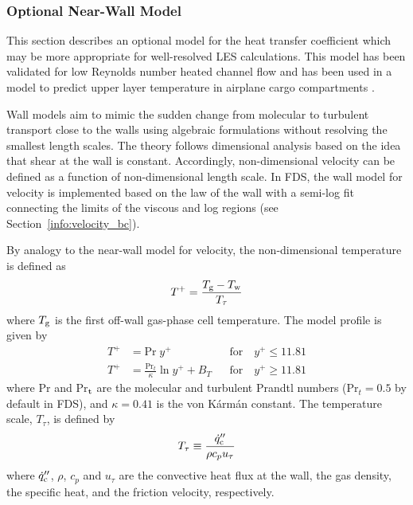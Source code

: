 \subsubsection{Optional Near-Wall Model}
\label{conflux_wall_model}

This section describes an optional model for the heat transfer coefficient which may be more appropriate for well-resolved LES calculations.  This model has been validated for low Reynolds number heated channel flow \cite{Park:2012} and has been used in a model to predict upper layer temperature in airplane cargo compartments \cite{Oztekin:FM2012}.

Wall models aim to mimic the sudden change from molecular to turbulent transport close to the walls using algebraic formulations without resolving the smallest length scales. The theory follows dimensional analysis based on the idea that shear at the wall is constant. Accordingly, non-dimensional velocity can be defined as a function of non-dimensional length scale. In FDS, the wall model for velocity is implemented based on the law of the wall with a semi-log fit connecting the limits of the viscous and log regions (see Section~\ref{info:velocity_bc}).

By analogy to the near-wall model for velocity, the non-dimensional temperature is defined as
\begin{equation}
T^+ = \frac{T_{\rm g} - T_{\rm w}}{T_\tau}
\end{equation}
where $T_{\rm g}$ is the first off-wall gas-phase cell temperature.  The model profile is given by
\begin{align}
\label{eqn_t_visclayer} T^+ &= \mbox{Pr}\;y^+                            && \mbox{for} \quad y^+ \le 11.81 \\
\label{eqn_t_loglaw}    T^+ &= \frac{\mbox{Pr}_t}{\kappa} \ln y^+ + B_T  && \mbox{for} \quad y^+ \ge 11.81
\end{align}
where Pr and Pr$_{\rm t}$ are the molecular and turbulent Prandtl numbers  (Pr$_t=0.5$ by default in FDS), and $\kappa = 0.41$ is the von K\'arm\'an constant.  The temperature scale, $T_{\tau}$, is defined by
\begin{equation}
\label{eqn_friction_temperature}
T_{\tau} \equiv \frac{\dot{q}_{\rm c}''}{{\rho}{c_p}{u_{\tau}}}
\end{equation}
where $\dot{q}_{\rm c}''$, $\rho$, $c_p$ and $u_{\tau}$  are the convective heat flux at the wall, the gas density, the specific heat, and the friction velocity, respectively.

